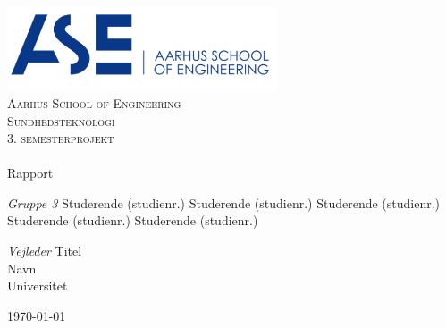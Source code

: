 \begin{titlingpage}
\begin{center}

~ \\[3cm]

\includegraphics[width=0.6\textwidth]{figurer/ASE}~\\[1cm]

\textsc{\LARGE Aarhus School of Engineering}\\[1.5cm]

\textsc{\Large Sundhedsteknologi}\\
\textsc{\Large 3. semesterprojekt}\\[0.5cm]

\noindent\makebox[\linewidth]{\rule{\textwidth}{0.4pt}}\\
[0.5cm]{\Huge Rapport}
\noindent\makebox[\linewidth]{\rule{\textwidth}{0.4pt}}

\end{center}

\textit{Gruppe 3} \newline
Studerende (studienr.) \newline
Studerende (studienr.) \newline
Studerende (studienr.) \newline
Studerende (studienr.) \newline		 
Studerende (studienr.) \newline  


\textit{Vejleder} \newline
Titel\\
Navn\\
Universitet


\vfill

\begin{center}
{\large \today}
\end{center}


\end{titlingpage}